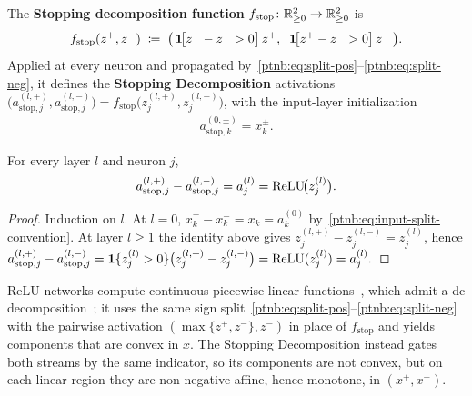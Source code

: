 The \textbf{Stopping decomposition function} $f_{\mathrm{stop}} \colon \mathbb{R}_{\ge 0}^2 \to \mathbb{R}_{\ge
    0}^2$ is
\begin{align}\label{ptnb:eq:stop-relu}
    f_{\mathrm{stop}}(z^+, z^-) \;\coloneqq\; \bigl(\,\mathbf{1}\!\bigl[z^+ - z^- > 0\bigr]\, z^+,\;\;
    \mathbf{1}\!\bigl[z^+ - z^- > 0\bigr]\, z^-\,\bigr).
\end{align}
Applied at every neuron and propagated by~\eqref{ptnb:eq:split-pos}--\eqref{ptnb:eq:split-neg}, it defines
the \textbf{Stopping Decomposition} activations $\bigl(a_{\mathrm{stop},j}^{(l,+)},
    a_{\mathrm{stop},j}^{(l,-)}\bigr) = f_{\mathrm{stop}}\bigl(z_j^{(l,+)}, z_j^{(l,-)}\bigr)$, with
the input-layer initialization
\begin{align}\label{ptnb:eq:input-split-convention}
    a_{\mathrm{stop},k}^{(0,\pm)} = x_k^{\pm}.
\end{align}

\begin{theoremenv}\label{ptnb:thm:decomp-recovery}
For every layer $l$ and neuron $j$,
\begin{align}\label{ptnb:eq:decomp-recovery-stop-mix}
    a_{\mathrm{stop},j}^{(l,+)} - a_{\mathrm{stop},j}^{(l,-)}
    =
    a_j^{(l)} = \text{ReLU}\!\bigl(z_j^{(l)}\bigr).
\end{align}\end{theoremenv}

\begin{proof}
Induction on $l$. At $l=0$, $x_k^+ - x_k^- = x_k = a_k^{(0)}$ by~\eqref{ptnb:eq:input-split-convention}.
At layer $l \ge 1$ the identity above gives $z_j^{(l,+)} - z_j^{(l,-)} = z_j^{(l)}$, hence
\(
    a_{\mathrm{stop},j}^{(l,+)} - a_{\mathrm{stop},j}^{(l,-)}
    = \mathbf{1}\{z_j^{(l)} > 0\}\bigl(z_j^{(l,+)} - z_j^{(l,-)}\bigr)
    = \text{ReLU}(z_j^{(l)})
    = a_j^{(l)}.
\)
\end{proof}

ReLU networks compute continuous piecewise linear functions~\parencite{Arora2018}, which
admit a \ac{dc} decomposition~\parencite{hiddenMono}; it uses the same sign
split~\eqref{ptnb:eq:split-pos}--\eqref{ptnb:eq:split-neg} with the pairwise activation $(\max\{z^+, z^-\},
    z^-)$ in place of $f_{\mathrm{stop}}$ and yields components that are convex in $x$. The Stopping
Decomposition instead gates both streams by the same indicator, so its components are not convex,
but on each linear region they are non-negative affine, hence monotone, in $(x^+, x^-)$.


